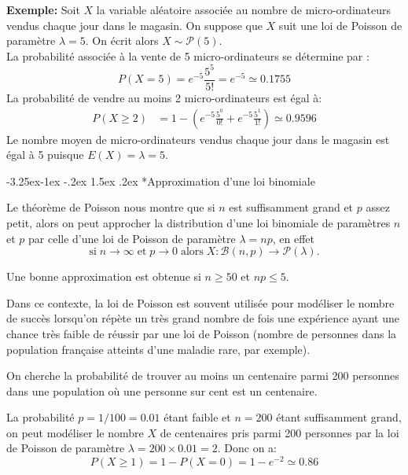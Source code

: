 \documentclass[]{book}
\makeatletter
\renewcommand\subsection{\@startsection{subsection}{2}{\z@}%
                                     {-3.25ex\@plus -1ex \@minus -.2ex}%
                                     {1.5ex \@plus .2ex}%
                                     {\normalfont\large\bfseries\color{Violet}}}
\theoremstyle{magentacolor}
\theoremstyle{proprie}
\theoremstyle{exstyle}
\theoremstyle{exostyle}
\theoremstyle{definition}
\theoremstyle{definition}
\theoremstyle{definition}
\theoremstyle{remark}
\makeatother
\begin{document}
\textbf{Exemple:} Soit \(X\) la variable aléatoire associée au nombre de micro-ordinateurs
vendus chaque jour dans le magasin. On suppose que \(X\) suit une loi de
Poisson de paramètre \(\lambda=5\). On écrit alors
\(X \sim \mathcal{P}(5).\)\\
La probabilité associée à la vente de 5 micro-ordinateurs se détermine
par : \[P(X=5)=e^{-5} \frac{5^5}{5!}=e^{-5}\simeq 0.1755\] La
probabilité de vendre au moins 2 micro-ordinateurs est égal à:
\[\begin{aligned}
P(X \geq 2)&=1-\left(e^{-5} \frac{5^0}{0!}+e^{-5} \frac{5^1}{1!}\right)\simeq 0.9596\end{aligned}\]
Le nombre moyen de micro-ordinateurs vendus chaque jour dans le magasin
est égal à 5 puisque \(E(X)=\lambda=5\).

\hypertarget{approximation-dune-loi-binomiale}{%
\subsection*{Approximation d'une loi binomiale}\label{approximation-dune-loi-binomiale}}

Le théorème de Poisson nous montre que si \(n\) est suffisamment grand et
\(p\) assez petit, alors on peut approcher la distribution d'une loi
binomiale de paramètres \(n\) et \(p\) par celle d'une loi de Poisson de
paramètre \(\lambda=np\), en effet
\[\text{si} \; n \rightarrow \infty \; \text{et}\; p \rightarrow 0 \; \text{alors} \; X: \mathcal{B}(n, p) \rightarrow \mathcal{P}(\lambda).\]

Une bonne approximation est obtenue si \(n \geq 50\) et \(np \leq 5\).

Dans ce contexte, la loi de Poisson est souvent utilisée pour modéliser
le nombre de succès lorsqu'on répète un très grand nombre de fois une
expérience ayant une chance très faible de réussir par une loi de
Poisson (nombre de personnes dans la population française atteints d'une
maladie rare, par exemple).

On cherche la probabilité de trouver au moins un centenaire parmi 200
personnes dans une population où une personne sur cent est un
centenaire.

La probabilité \(p=1/100=0.01\) étant faible et \(n=200\) étant suffisamment
grand, on peut modéliser le nombre \(X\) de centenaires pris parmi 200
personnes par la loi de Poisson de paramètre
\(\lambda=200 \times 0.01=2\). Donc on a:
\[P(X\geq 1)=1-P(X=0)=1-e^{-2}\simeq 0.86\]
\end{document}
